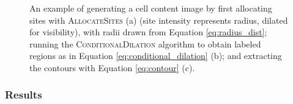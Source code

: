 \begin{figure}%
    \centering
    \qquad
    \qquad
    \caption{An example of generating a cell content image by first allocating sites with \textsc{AllocateSites} (a) (site intensity represents radius, dilated for visibility), with radii drawn from Equation \ref{eq:radius_dist}; running the \textsc{ConditionalDilation} algorithm to obtain labeled regions as in Equation \ref{eq:conditional_dilation} (b); and extracting the contours with Equation \ref{eq:contour} (c).}%
    \label{fig:conditional_dilation_process}
\end{figure}

\subsubsection{Results}

